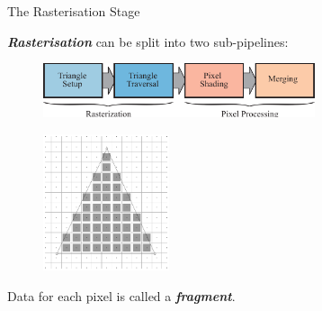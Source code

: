 \documentclass{beamer}
\newcommand{\emphbf}[1]{\textbf{\emph{#1}}}
\begin{document}
%
%
%

\begin{frame}{The Rasterisation Stage}

	\emphbf{Rasterisation} can be split into two sub-pipelines:

	\begin{figure}[t]
		\includegraphics[width=8cm]{rasterisation-pipeline}
		\centering
	\end{figure}

	\begin{figure}[t]
		\includegraphics[height=4cm]{fragment}
		\centering
	\end{figure}

	Data for each pixel is called a \emphbf{fragment}.

\end{frame}
\end{document}
